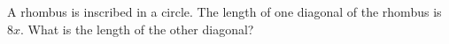 A rhombus is inscribed in a circle. The length of one diagonal of the rhombus is $8x$. What is the length of the other diagonal?
